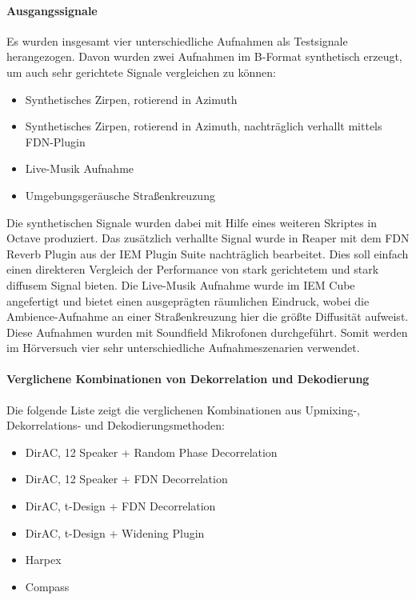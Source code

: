 \paragraph{Ausgangssignale}
Es wurden insgesamt vier unterschiedliche Aufnahmen als Testsignale herangezogen. Davon wurden zwei Aufnahmen im B-Format synthetisch erzeugt, um auch sehr gerichtete Signale vergleichen zu können:

\begin{itemize}
	\item Synthetisches Zirpen, rotierend in Azimuth
	\item Synthetisches Zirpen, rotierend in Azimuth, nachträglich verhallt mittels FDN-Plugin
	\item Live-Musik Aufnahme
	\item Umgebungsgeräusche Straßenkreuzung
\end{itemize}

Die synthetischen Signale wurden dabei mit Hilfe eines weiteren Skriptes in Octave produziert. Das zusätzlich verhallte Signal wurde in Reaper mit dem FDN Reverb Plugin aus der IEM Plugin Suite \protect\footnotemark nachträglich bearbeitet. Dies soll einfach einen direkteren Vergleich der Performance von stark gerichtetem und stark diffusem Signal bieten. Die Live-Musik Aufnahme wurde im IEM Cube angefertigt und bietet einen ausgeprägten räumlichen Eindruck, wobei die Ambience-Aufnahme an einer Straßenkreuzung hier die größte Diffusität aufweist. Diese Aufnahmen wurden mit Soundfield Mikrofonen durchgeführt. Somit werden im Hörversuch vier sehr unterschiedliche Aufnahmeszenarien verwendet.


\paragraph{Verglichene Kombinationen von Dekorrelation und Dekodierung}

Die folgende Liste zeigt die verglichenen Kombinationen aus Upmixing-, Dekorrelations- und Dekodierungsmethoden:

\begin{itemize}
	\item DirAC, 12 Speaker + Random Phase Decorrelation
	\item DirAC, 12 Speaker + FDN Decorrelation
	\item DirAC, t-Design + FDN Decorrelation
	\item DirAC, t-Design + Widening Plugin
	\item Harpex \protect\footnotemark
	\item Compass \protect\footnotemark
\end{itemize}

